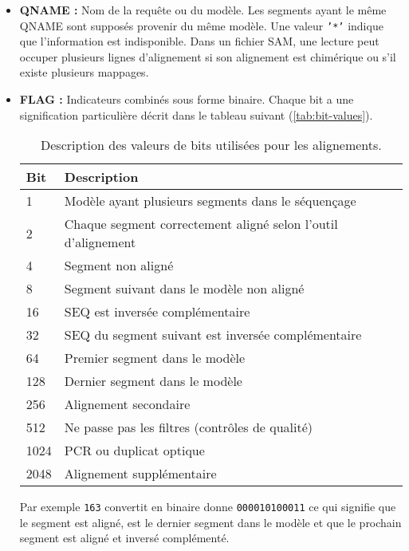 \begin{itemize}
    \item \textbf{QNAME :} Nom de la requête ou du modèle.
    Les segments ayant le même QNAME sont supposés provenir du même modèle.
    Une valeur \texttt{'*'} indique que l'information est indisponible.
    Dans un fichier SAM, une lecture peut occuper plusieurs lignes d'alignement si son alignement est chimérique ou s'il existe plusieurs mappages.

    \item \textbf{FLAG :} Indicateurs combinés sous forme binaire.
    Chaque bit a une signification particulière décrit dans le tableau suivant (\autoref{tab:bit-values}).
    \begin{table}[h!]
        \centering
        \begin{tabular}{lp{10.3cm}}
            \toprule
            \textbf{Bit} & \textbf{Description} \\
            \midrule
            1    & Modèle ayant plusieurs segments dans le séquençage \\
            2    & Chaque segment correctement aligné selon l'outil d'alignement \\
            4    & Segment non aligné \\
            8    & Segment suivant dans le modèle non aligné \\
            16   & SEQ est inversée complémentaire \\
            32   & SEQ du segment suivant est inversée complémentaire \\
            64   & Premier segment dans le modèle \\
            128  & Dernier segment dans le modèle \\
            256  & Alignement secondaire \\
            512  & Ne passe pas les filtres (contrôles de qualité) \\
            1024 & PCR ou duplicat optique \\
            2048 & Alignement supplémentaire \\
            \bottomrule
        \end{tabular}
        \caption{Description des valeurs de bits utilisées pour les alignements.}
        \label{tab:bit-values}
    \end{table}

    \noindent Par exemple \texttt{163} convertit en binaire donne \texttt{000010100011} ce qui signifie que le segment est aligné, est le dernier segment dans le modèle et que le prochain segment est aligné et inversé complémenté.


\end{itemize}
